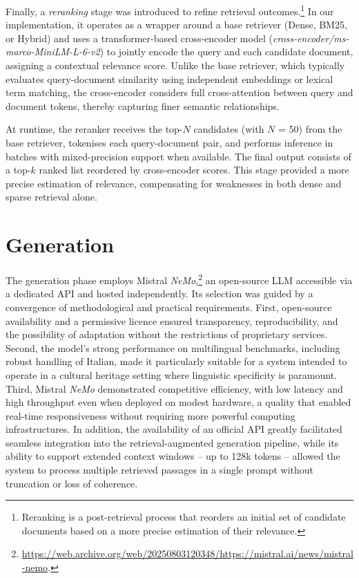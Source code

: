 \begin{spacing}{1.5}
Finally, a \textit{reranking} stage was introduced to refine retrieval outcomes.\footnote{Reranking is a post-retrieval process that reorders an initial set of candidate documents based on a more precise estimation of their relevance.} In our implementation, it operates as a wrapper around a base retriever (Dense, BM25, or Hybrid) and uses a transformer-based cross-encoder model (\textit{cross-encoder/ms-marco-MiniLM-L-6-v2}) to jointly encode the query and each candidate document, assigning a contextual relevance score. Unlike the base retriever, which typically evaluates query-document similarity using independent embeddings or lexical term matching, the cross-encoder considers full cross-attention between query and document tokens, thereby capturing finer semantic relationships.

At runtime, the reranker receives the top-$N$ candidates (with $N$ = 50) from the base retriever, tokenises each query-document pair, and performs inference in batches with mixed-precision support when available. The final output consists of a top-$k$ ranked list reordered by cross-encoder scores. This stage provided a more precise estimation of relevance, compensating for weaknesses in both dense and sparse retrieval alone.


\section{Generation}\label{sec:rag_generation}
The generation phase employs Mistral \textit{NeMo},\footnote{\url{https://web.archive.org/web/20250803120348/https://mistral.ai/news/mistral-nemo}.\nocite{noauthor_mistral_2025}} an open-source LLM accessible via a dedicated API and hosted independently. Its selection was guided by a convergence of methodological and practical requirements. First, open-source availability and a permissive licence ensured transparency, reproducibility, and the possibility of adaptation without the restrictions of proprietary services. Second, the model’s strong performance on multilingual benchmarks, including robust handling of Italian, made it particularly suitable for a system intended to operate in a cultural heritage setting where linguistic specificity is paramount. Third, Mistral \textit{NeMo} demonstrated competitive efficiency, with low latency and high throughput even when deployed on modest hardware, a quality that enabled real-time responsiveness without requiring more powerful computing infrastructures. In addition, the availability of an official API greatly facilitated seamless integration into the retrieval-augmented generation pipeline, while its ability to support extended context windows -- up to 128k tokens -- allowed the system to process multiple retrieved passages in a single prompt without truncation or loss of coherence.


\end{spacing}
